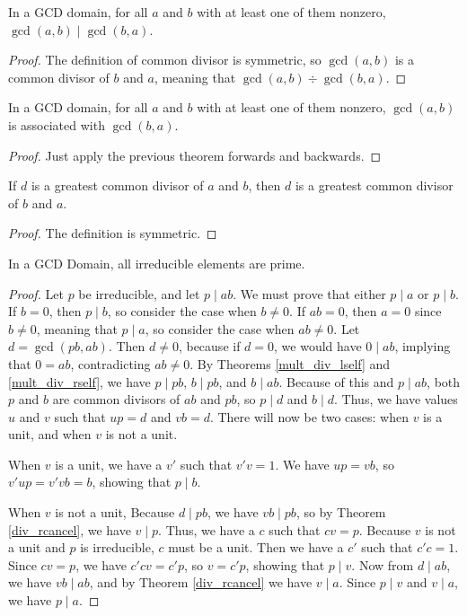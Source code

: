 \documentclass[../../math.tex]{subfiles}
\begin{document}
\begin{theorem} \label{gcd_div_comm}
    In a GCD domain, for all $a$ and $b$ with at least one of them nonzero,
    $\gcd(a, b) \mid \gcd(b, a)$.
\end{theorem}
\begin{proof}
    The definition of common divisor is symmetric, so $\gcd(a, b)$ is a common
    divisor of $b$ and $a$, meaning that $\gcd(a, b) \div \gcd(b, a)$.
\end{proof}

\begin{theorem} \label{gcd_comm}
    In a GCD domain, for all $a$ and $b$ with at least one of them nonzero,
    $\gcd(a, b)$ is associated with $\gcd(b, a)$.
\end{theorem}
\begin{proof}
    Just apply the previous theorem forwards and backwards.
\end{proof}

\begin{theorem} \label{is_gcd_comm}
    If $d$ is a greatest common divisor of $a$ and $b$, then $d$ is a greatest
    common divisor of $b$ and $a$.
\end{theorem}
\begin{proof}
    The definition is symmetric.
\end{proof}

\begin{theorem} \label{irreducible_prime}
    In a GCD Domain, all irreducible elements are prime.
\end{theorem}
\begin{proof}
    Let $p$ be irreducible, and let $p \mid ab$.  We must prove that either $p
    \mid a$ or $p \mid b$.  If $b = 0$, then $p \mid b$, so consider the case
    when $b \neq 0$.  If $ab = 0$, then $a = 0$ since $b \neq 0$, meaning that
    $p \mid a$, so consider the case when $ab \neq 0$.  Let $d = \gcd(pb, ab)$.
    Then $d \neq 0$, because if $d = 0$, we would have $0 \mid ab$, implying
    that $0 = ab$, contradicting $ab \neq 0$.  By Theorems \ref{mult_div_lself}
    and \ref{mult_div_rself}, we have $p \mid pb$, $b \mid pb$, and $b \mid ab$.
    Because of this and $p \mid ab$, both $p$ and $b$ are common divisors of
    $ab$ and $pb$, so $p \mid d$ and $b \mid d$.  Thus, we have values $u$ and
    $v$ such that $up = d$ and $vb = d$.  There will now be two cases: when $v$
    is a unit, and when $v$ is not a unit.

    When $v$ is a unit, we have a $v'$ such that $v'v = 1$.  We have $up = vb$,
    so $v'up = v'vb = b$, showing that $p \mid b$.

    When $v$ is not a unit, Because $d \mid pb$, we have $vb \mid pb$, so by
    Theorem \ref{div_rcancel}, we have $v \mid p$.  Thus, we have a $c$ such
    that $cv = p$.  Because $v$ is not a unit and $p$ is irreducible, $c$ must
    be a unit.  Then we have a $c'$ such that $c'c = 1$.  Since $cv = p$, we
    have $c'cv = c'p$, so $v = c'p$, showing that $p \mid v$.  Now from $d \mid
    ab$, we have $vb \mid ab$, and by Theorem \ref{div_rcancel} we have $v \mid
    a$.  Since $p \mid v$ and $v \mid a$, we have $p \mid a$.
\end{proof}
\end{document}
